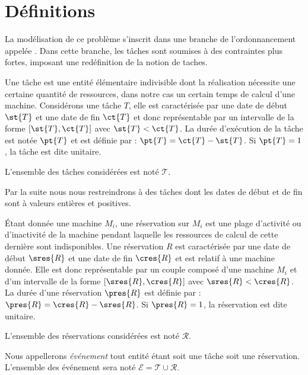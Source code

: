 \section{Définitions}
\label{intro_def}

La modélisation de ce problème s'inscrit dans une branche de l'ordonnancement appelée \isched. Dans
cette branche, les tâches sont soumises à des contraintes plus fortes, imposant une redéfinition de
la notion de taches.

\begin{ndf}[Tâche]
    Une tâche est une entité élémentaire indivisible dont la réalisation nécessite une certaine
    quantité de ressources, dans notre cas un certain temps de calcul d'une machine. Considérons une
    tâche $T$, elle est caractérisée par une date de début $\st{T}$ et une date de fin $\ct{T}$ et donc
    représentable par un intervalle de la forme $[\st{T}, \ct{T}]$ avec $\st{T} < \ct{T}$. La durée d'exécution
    de la tâche est notée $\pt{T}$ et est définie par : $\pt{T} = \ct{T} - \st{T}$. Si $\pt{T} = 1$,
    la tâche est dite unitaire.

    L'ensemble des tâches considérées est noté $\mathcal{T}$.
\end{ndf}

\begin{nrmq}
    Par la suite nous nous restreindrons à des tâches dont les dates de début et de fin sont à
    valeurs entières et positives.
\end{nrmq}

\begin{ndf}[Réservation]
    Étant donnée une machine $M_i$, une réservation sur $M_i$ est une plage d'activité ou
    d'inactivité de la machine pendant laquelle les ressources de calcul de cette dernière sont
    indisponibles. Une réservation $R$ est caractérisée par une date de début $\sres{R}$ et une date de fin
    $\cres{R}$ et est relatif à une machine donnée. Elle est donc représentable par un couple composé
    d'une machine $M_i$ et d'un intervalle de la forme $[\sres{R}, \cres{R}]$ avec $\sres{R} < \cres{R}$.
    La durée d'une réservation $\pres{R}$ est définie par :  $\pres{R} = \cres{R} - \sres{R}$. Si
    $\pres{R} = 1$, la réservation est dite unitaire.

    L'ensemble des réservations considérées est noté $\mathcal{R}$.
\end{ndf}

\begin{ndf}[Événements]
    Nous appellerons \emph{événement} tout entité étant soit une tâche soit une réservation.
    L'ensemble des événement sera noté $\mathcal{E} = \mathcal{T} \cup \mathcal{R}$.
\end{ndf}

